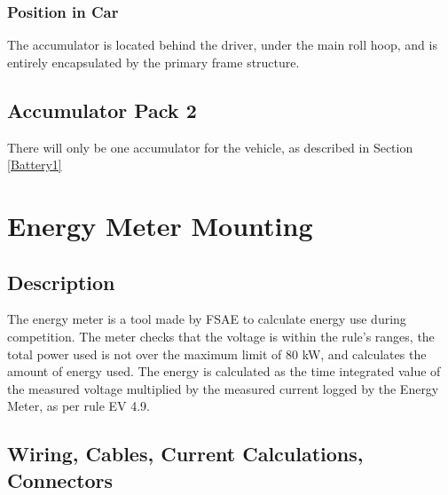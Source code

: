 \documentclass{article}
\begin{document}
        \subsubsection{Position in Car}

        The accumulator is located behind the driver, under the main roll hoop, and is entirely encapsulated by the primary frame structure.

    \subsection{Accumulator Pack 2}
        There will only be one accumulator for the vehicle, as described in Section \ref{Battery1}

\newpage

\section{Energy Meter Mounting}

    \subsection{Description}

        
        The energy meter is a tool made by FSAE to calculate energy use during competition. The meter checks that the voltage is within the rule's ranges, the total power used is not over the maximum limit of 80 kW, and calculates the amount of energy used. The energy is calculated as the time integrated value of the measured voltage multiplied by the measured current logged by the Energy Meter, as per rule EV 4.9. 

    \subsection{Wiring, Cables, Current Calculations, Connectors}

        
\end{document}
